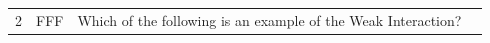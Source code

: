 \documentclass[10pt]{article}
\begin{document}
\begin{tiny}
\begin{longtable}{r p{0.3in} p{1.212in} p{3.8in}}
    2  &          FFF &                                                                                                                                                                                                                    Which of the following is an example of the Weak Interaction? &                                                                                                                                                                                                                                                                                                                                                                                                                                                                                                                                                                                                                                                                                                                                                                                                                                                                                                                                                                                                                                                                                                                                                                                                                                                                                                                                                                                                                                                                                                                                                                                                                                                                                                                                                                                                                                                                                                                                                                                                                                                                                                                                                                                                                                                                                                                                                                                                                                                                                                                                                                                                                                                                                                                                                                                                                                                                                                                                                                                                                                                                                               
\end{longtable}
\end{tiny}
\end{document}
